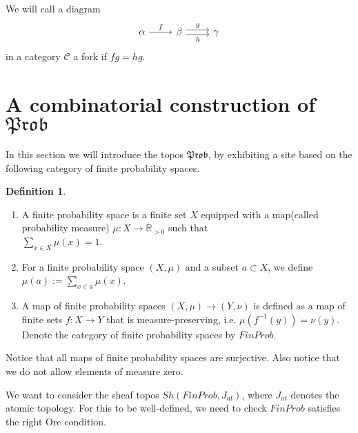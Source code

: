 \documentclass[a4paper]{amsproc}
\theoremstyle{plain}
\theoremstyle{definition}
\newtheorem{definition}[theorem]{Definition}
\theoremstyle{remark}
\numberwithin{equation}{section}
\begin{document}
We will call a diagram
\[
\begin{tikzcd}
\alpha \arrow[r, "f"] & \beta \arrow[r, "g", shift left] \arrow[r, "h"', shift right] & \gamma
\end{tikzcd}
\]
in a category $\mathcal{C}$ a fork if $fg = hg$.


\section{A combinatorial construction of $\mathfrak{Prob}$}

In this section we will introduce the topos $\mathfrak{Prob}$, by exhibiting a site based on the following category of finite probability spaces.

\begin{definition}
\begin{enumerate}
\item A finite probability space is a finite set $X$ equipped with a map(called probability measure) $\mu: X \to \mathbb{R}_{>0}$ such that \\ $\sum_{x \in X} \mu(x) = 1$.
\item For a finite probability space $(X,\mu)$ and a subset $a \subset X$, we define $\mu(a) := \sum_{x \in a} \mu(x)$.
\item A map of finite probability spaces $(X,\mu) \to (Y,\nu)$ is defined as a map of finite sets $f: X \to Y$ that is measure-preserving, i.e. $\mu(f^{-1}(y)) = \nu(y)$. Denote the category of finite probability spaces by $FinProb$.
\end{enumerate}
\end{definition}

Notice that all maps of finite probability spaces are surjective. Also notice that we do not allow elements of measure zero.

We want to consider the sheaf topos $Sh(FinProb, J_{at})$, where $J_{at}$ denotes the atomic topology. For this to be well-defined, we need to check $FinProb$ satisfies the right Ore condition.
\end{document}
